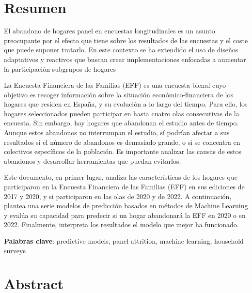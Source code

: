 
\chapter*{Resumen}

\onehalfspacing

El abandono de hogares panel en encuestas longitudinales es un asunto preocupante por el efecto que tiene sobre los resultados de las encuestas y el coste que puede suponer tratarlo. En este contexto se ha extendido el uso de diseños adaptativos y reactivos que buscan crear implementaciones enfocadas a aumentar la participación subgrupos de hogares


La Encuesta Financiera de las Familias (EFF) es una encuesta bienal cuyo objetivo es recoger información sobre la situación económico-financiera de los hogares que residen en España, y su evolución a lo largo del tiempo. Para ello, los hogares seleccionados pueden participar en hasta cuatro olas consecutivas de la encuesta. Sin embargo, hay hogares que abandonan el estudio antes de tiempo. Aunque estos abandonos no interrumpan el estudio, sí podrían afectar a sus resultados si el número de abandonos es demasiado grande, o si se concentra en colectivos específicos de la población. Es importante analizar las causas de estos abandonos y desarrollar herramientas que puedan evitarlos.

Este documento, en primer lugar, analiza las características de los hogares que participaron en la Encuesta Financiera de las Familias (EFF) en sus ediciones de 2017 y 2020, y si participaron en las olas de 2020 y de 2022. A continuación, plantea una serie modelos de predicción basados en métodos de Machine Learning y evalúa su capacidad para predecir si un hogar abandonará la EFF en 2020 o en 2022. Finalmente, interpreta los resultados el modelo que mejor ha funcionado.

\vspace{1.5cm}

\textbf{Palabras clave}: predictive models, panel attrition, machine learning, household surveys

\chapter*{Abstract}

\onehalfspacing


